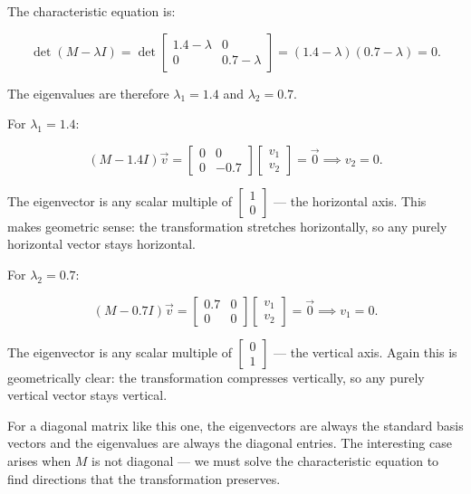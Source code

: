 \documentclass[11pt,openany]{book}
\theoremstyle{definition}
\begin{document}
The characteristic equation is:

\[
\det(M - \lambda I) 
= \det\begin{bmatrix} 1.4 - \lambda & 0 \\ 0 & 0.7 - \lambda \end{bmatrix}
= (1.4 - \lambda)(0.7 - \lambda) = 0.
\]

The eigenvalues are therefore $\lambda_1 = 1.4$ and $\lambda_2 = 0.7$.

\medskip

For $\lambda_1 = 1.4$:

\[
(M - 1.4I)\vec{v} = 
\begin{bmatrix} 0 & 0 \\ 0 & -0.7 \end{bmatrix}
\begin{bmatrix} v_1 \\ v_2 \end{bmatrix} = \vec{0}
\implies v_2 = 0.
\]

The eigenvector is any scalar multiple of $\begin{bmatrix} 1 \\ 0 \end{bmatrix}$ 
--- the horizontal axis. This makes geometric sense: the transformation stretches 
horizontally, so any purely horizontal vector stays horizontal.

\medskip

For $\lambda_2 = 0.7$:

\[
(M - 0.7I)\vec{v} = 
\begin{bmatrix} 0.7 & 0 \\ 0 & 0 \end{bmatrix}
\begin{bmatrix} v_1 \\ v_2 \end{bmatrix} = \vec{0}
\implies v_1 = 0.
\]

The eigenvector is any scalar multiple of $\begin{bmatrix} 0 \\ 1 \end{bmatrix}$ 
--- the vertical axis. Again this is geometrically clear: the transformation 
compresses vertically, so any purely vertical vector stays vertical.

\medskip

For a diagonal matrix like this one, the eigenvectors are always the standard basis 
vectors and the eigenvalues are always the diagonal entries. The interesting case 
arises when $M$ is not diagonal --- we must solve the characteristic equation to 
find directions that the transformation preserves.
\end{document}
